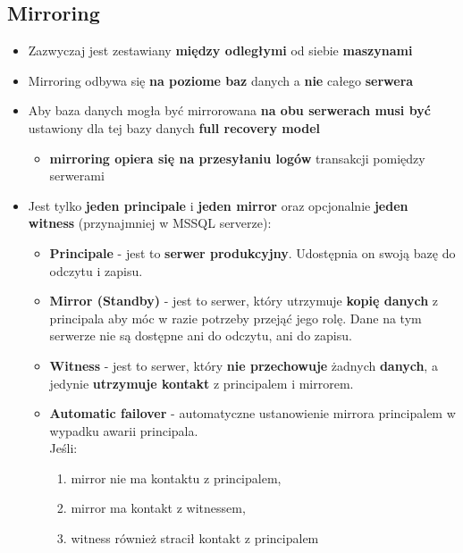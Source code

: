 \documentclass[a4paper]{article}
\begin{document}
    \subsection{Mirroring}
    \begin{itemize}[noitemsep]
        \item Zazwyczaj jest zestawiany \textbf{między odległymi} od siebie \textbf{maszynami}
        \item Mirroring odbywa się \textbf{na poziome baz} danych a \textbf{nie} całego \textbf{serwera}
        \item Aby baza danych mogła być mirrorowana \textbf{na obu serwerach musi być} ustawiony dla tej bazy danych
        \textbf{full recovery model}
        \begin{itemize}[noitemsep]
            \item \textbf{mirroring opiera się na przesyłaniu logów} transakcji pomiędzy serwerami
        \end{itemize}
        \item Jest tylko \textbf{jeden principale} i \textbf{jeden mirror} oraz opcjonalnie \textbf{jeden witness}
        (przynajmniej w MSSQL serverze):
        \begin{itemize}[noitemsep]
            \item \textbf{Principale} - jest to \textbf{serwer produkcyjny}. Udostępnia on swoją bazę do odczytu i zapisu.
            \item \textbf{Mirror (Standby)} - jest to serwer, który utrzymuje \textbf{kopię danych} z principala aby móc w razie
            potrzeby przejąć jego rolę. Dane na tym serwerze nie są dostępne ani do odczytu, ani do zapisu.
            \item \textbf{Witness} - jest to serwer, który \textbf{nie przechowuje} żadnych \textbf{danych}, a jedynie
            \textbf{utrzymuje kontakt} z principalem i mirrorem.
            \item \textbf{Automatic failover} - automatyczne ustanowienie mirrora principalem w wypadku awarii
            principala.\\
            Jeśli:
            \begin{enumerate}
                \item mirror nie ma kontaktu z principalem,
                \item mirror ma kontakt z witnessem,
                \item witness również stracił kontakt z principalem
            \end{enumerate}

\end{itemize}
\end{itemize}
\end{document}
